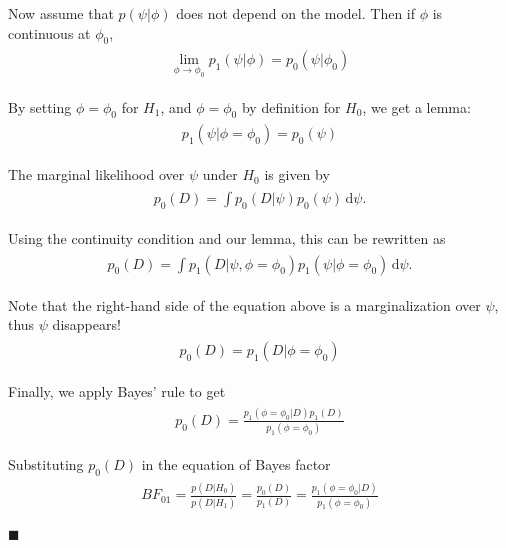 \documentclass[paper=a4, fontsize=11pt]{scrartcl} %
\numberwithin{equation}{section} %
\numberwithin{figure}{section} %
\numberwithin{table}{section} %
\begin{document}
Now assume that $p( \psi | \phi)$ does not depend on the model. Then if $\phi$ is continuous at $\phi_0$, 
\begin{align}
\begin{split}
\lim_{\phi \rightarrow \phi_0} {p_1( \psi | \phi) = p_0(\psi | \phi_0)} 
\end{split}
\end{align}

By setting $\phi = \phi_0$ for $H_1$, and $\phi = \phi_0$ by definition for $H_0$, we get a lemma:
\begin{align}
\begin{split}
p_1( \psi | \phi = \phi_0) = p_0(\psi)
\end{split}
\end{align}

The marginal likelihood over $\psi$ under $H_0$ is given by
\begin{align}
\begin{split}
p_0(D) = \int \! p_0(D | \psi) p_0(\psi) \, \mathrm{d}\psi.
\end{split}
\end{align}

Using the continuity condition and our lemma, this can be rewritten as
\begin{align}
\begin{split}
p_0(D) = \int \! p_1(D | \psi, \phi=\phi_0) p_1(\psi | \phi = \phi_0) \, \mathrm{d}\psi.
\end{split}
\end{align}

Note that the right-hand side of the equation above is a marginalization over $\psi$, thus $\psi$ disappears!
\begin{align}
\begin{split}
p_0(D) = p_1(D | \phi = \phi_0)
\end{split}
\end{align}

Finally, we apply Bayes' rule to get
 \begin{align}
\begin{split}
p_0(D) = \frac{p_1(\phi = \phi_0 | D) p_1(D)}{p_1(\phi = \phi_0)} 
\end{split}
\end{align}

Substituting $p_0(D)$ in the equation of Bayes factor
\begin{align}
\begin{split}
BF_{01} = \frac{p(D|H_0)}{p(D|H_1)} =\frac{p_0(D)}{p_1(D)} = \frac{p_1(\phi = \phi_0 | D)}{p_1(\phi = \phi_0)}
\end{split}
\end{align}

$\blacksquare$

\end{document}

